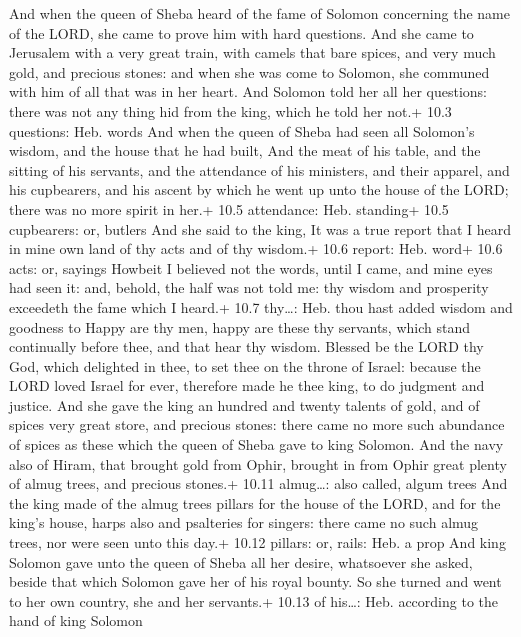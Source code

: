  And when the queen of Sheba heard of the fame of Solomon
concerning the name of the LORD, she came to prove him with hard
questions.  And she came to Jerusalem with a very great
train, with camels that bare spices, and very much gold, and precious
stones: and when she was come to Solomon, she communed with him of all
that was in her heart.  And Solomon told her all her
questions: there was not any thing hid from the king, which he told her
not.+ 10.3 questions: Heb. words  And when the queen of
Sheba had seen all Solomon's wisdom, and the house that he had built,
 And the meat of his table, and the sitting of his servants,
and the attendance of his ministers, and their apparel, and his
cupbearers, and his ascent by which he went up unto the house of the
LORD; there was no more spirit in her.+ 10.5 attendance: Heb. standing+
10.5 cupbearers: or, butlers  And she said to the king, It
was a true report that I heard in mine own land of thy acts and of thy
wisdom.+ 10.6 report: Heb. word+ 10.6 acts: or, sayings 
Howbeit I believed not the words, until I came, and mine eyes had seen
it: and, behold, the half was not told me: thy wisdom and prosperity
exceedeth the fame which I heard.+ 10.7 thy\ldots: Heb. thou hast added
wisdom and goodness to  Happy are thy men, happy are these
thy servants, which stand continually before thee, and that hear thy
wisdom.  Blessed be the LORD thy God, which delighted in
thee, to set thee on the throne of Israel: because the LORD loved Israel
for ever, therefore made he thee king, to do judgment and justice.
 And she gave the king an hundred and twenty talents of
gold, and of spices very great store, and precious stones: there came no
more such abundance of spices as these which the queen of Sheba gave to
king Solomon.  And the navy also of Hiram, that brought
gold from Ophir, brought in from Ophir great plenty of almug trees, and
precious stones.+ 10.11 almug\ldots: also called, algum trees
 And the king made of the almug trees pillars for the house
of the LORD, and for the king's house, harps also and psalteries for
singers: there came no such almug trees, nor were seen unto this day.+
10.12 pillars: or, rails: Heb. a prop  And king Solomon
gave unto the queen of Sheba all her desire, whatsoever she asked,
beside that which Solomon gave her of his royal bounty. So she turned
and went to her own country, she and her servants.+ 10.13 of his\ldots:
Heb. according to the hand of king Solomon

